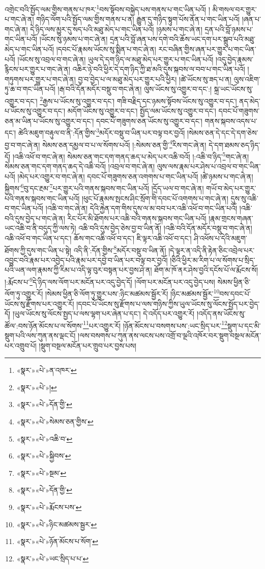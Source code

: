 འགྲེང་བའི་སྤྱོད་ལམ་གྱིས་གནས་པ་ཁར་\footnote{«སྣར་»«པེ་»ན་འཁར་}བས་སྟོབས་བསྐྱེད་པས་གནས་པ་གང་ཡིན་པའོ། །
མི་གསལ་བར་གྱུར་པ་གང་ཞེ་ན། གཉིད་ལོག་པའི་སྤྱོད་ལམ་གྱིས་གནས་པ་ན། རྒྱུན་དུ་གཉིད་སྟུག་པོས་ནོན་པ་གང་ཡིན་པའོ། །ཞན་པ་གང་ཞེ་ན། དེ་ཉིད་ལས་མྱུར་དུ་སད་པའི་མཐུ་མེད་པ་གང་ཡིན་པའོ། །ཉམས་པ་གང་ཞེ་ན། དྲན་པའི་བློ་ཉམས་པ་གང་ཡིན་པའོ། །ཡོངས་སུ་ཉམས་པ་གང་ཞེ་ན། དྲན་པའི་བློ་ཞན་པས་དགེ་བའི་ཆོས་ཡང་དག་པར་སྒྲུབ་པའི་མཐུ་མེད་པ་གང་ཡིན་པའོ། །དབང་པོ་རྣམས་ཡོངས་སུ་སྨིན་པ་གང་ཞེ་ན། རང་བཞིན་གྱིས་ཞན་པར་གྱུར་པ་གང་ཡིན་པའོ། །ཡོངས་སུ་འབྲལ་བ་གང་ཞེ་ན། ཡུལ་དེ་དག་ཉིད་ལ་མཐུ་མེད་པར་གྱུར་པ་གང་ཡིན་པའོ། །འདུ་བྱེད་རྣམས་རྙིངས་པར་གྱུར་པ་གང་ཞེ་ན། འཆིར་ཉེ་བའི་ཕྱིར་དེ་དག་ཉིད་ཀྱི་ཐ་མའི་དུས་སྐབས་ལ་བབ་པ་གང་ཡིན་པའོ། །གཏུགས་པར་གྱུར་པ་གང་ཞེ་ན། བྱ་བ་བྱེད་པ་ལ་མཐུ་མེད་པར་གྱུར་པའི་ཕྱིར། །ཚེ་ཡོངས་སུ་ཟད་པ་ན། ལུས་འཇིག་ཏུ་ཆ་བ་གང་ཡིན་པའོ། །རྒ་བའི་དོན་མདོར་བསྡུ་བ་གང་ཞེ་ན། ལུས་ཡོངས་སུ་འགྱུར་བ་དང་:། སྐྲ་ཡང་ཡོངས་སུ་འགྱུར་བ་དང་། \footnote{«སྣར་»«པེ་»།  }རྒྱས་པ་ཡོངས་སུ་འགྱུར་བ་དང་། གཟི་བརྗིད་དང་ཉམས་སྟོབས་ཡོངས་སུ་འགྱུར་བ་དང་། ནད་མེད་པ་ཡོངས་སུ་འགྱུར་བ་དང་། མདོག་ཡོངས་སུ་འགྱུར་བ་དང་། སྤྱོད་ལམ་ཡོངས་སུ་འགྱུར་བ་དང་། དབང་པོ་གཟུགས་ཅན་མ་ཡིན་པ་ཡོངས་སུ་འགྱུར་བ་དང་། དབང་པོ་གཟུགས་ཅན་ཡོངས་སུ་འགྱུར་བ་དང་། གནས་སྐབས་འདས་པ་དང་། ཚེའི་མཇུག་བརྟུལ་བ་ནི་:དོན་གྱིས་\footnote{«སྣར་»«པེ་»དོན་གྱི་}མདོར་བསྡུ་བ་ཡིན་པར་བལྟ་བར་བྱའོ། །སེམས་ཅན་དེ་དང་དེ་དག་ཅེས་བྱ་བ་གང་ཞེ་ན། སེམས་ཅན་དམྱལ་བ་པ་ལ་སོགས་པའོ། །:སེམས་ཅན་གྱི་\footnote{«སྣར་»«པེ་»སེམས་ཅན་གྱིས་}རིས་གང་ཞེ་ན། དེ་དག་ཐམས་ཅད་ཉིད་དོ། །འཆི་འཕོ་བ་གང་ཞེ་ན། སེམས་ཅན་གང་དག་གནད་ཆད་པ་མེད་པར་འཆི་བའོ། །:འཆི་བ་ཉིད་\footnote{«སྣར་»«པེ་»འཆི་བ་}གང་ཞེ་ན། སེམས་ཅན་གང་དག་གནད་ཆད་དེ་འཆི་བའོ། །འབྲལ་བ་གང་ཞེ་ན། ལུས་ལས་རྣམ་པར་ཤེས་པ་འབྲལ་བ་གང་ཡིན་པའོ། །མེད་པར་འགྱུར་བ་གང་ཞེ་ན། དབང་པོ་གཟུགས་ཅན་འགགས་པ་གང་ཡིན་པའོ། །ཚེ་ཉམས་པ་གང་ཞེ་ན། སྐྱིགས་\footnote{«སྣར་»«པེ་»སྐྱིབས་}བུ་དང་རྔམ་\footnote{«སྣར་»«པེ་»སྔམ་}པར་གྱུར་པའི་གནས་སྐབས་གང་ཡིན་པའོ། །དྲོད་ཡལ་བ་གང་ཞེ་ན། གཡོ་བ་མེད་པར་གྱུར་པའི་གནས་སྐབས་གང་ཡིན་པའོ། །ཕུང་པོ་རྣམས་སྤངས་ཤིང་སྲོག་གི་དབང་པོ་འགགས་པ་གང་ཞེ་ན། དུས་སུ་འཆི་བ་གང་ཡིན་པའོ། །འཆི་བ་གང་ཞེ་ན། དེའི་རྐྱེན་དག་གིས་དུས་ལ་མ་བབ་པར་འཆི་འཕོ་བ་གང་ཡིན་པའོ། །འཆི་བའི་དུས་བྱེད་པ་གང་ཞེ་ན། རིང་པོར་མི་ཐོགས་པར་འཆི་བའི་གནས་སྐབས་གང་ཡིན་པའོ། །རྣམ་གྲངས་གཞན་ཡང་འཆི་བ་ནི་བདུད་ཀྱི་ལས་ཏེ། འཆི་བའི་དུས་བྱེད་ཅེས་བྱ་བ་ཡིན་ནོ། །འཆི་བའི་དོན་མདོར་བསྡུ་བ་གང་ཞེ་ན། འཆི་འཕོ་བ་གང་ཡིན་པ་དང་། ཆོས་གང་འཆི་འཕོ་བ་དང་། ཇི་ལྟར་འཆི་འཕོ་བ་དང་། ཤི་འཕོས་པ་དེའི་མཇུག་ཐོགས་ཀྱི་དུས་གང་ཡིན་པ་སྟེ། འདི་ནི་:དོན་གྱིས་\footnote{«སྣར་»«པེ་»དོན་གྱི་}མདོར་བསྡུ་བ་ཡིན་ནོ། །དེ་ལྟར་ན་འདི་ནི་རྟེན་ཅིང་འབྲེལ་པར་འབྱུང་བའི་རྣམ་པར་འབྱེད་པའི་རྣམ་པར་དབྱེ་བ་ཡིན་པར་བལྟ་བར་བྱའོ། །ཅིའི་ཕྱིར་མ་རིག་པ་ལ་སོགས་པ་སྲིད་པའི་ཡན་ལག་རྣམས་ཀྱི་རིམ་པ་འདི་ལྟ་བུར་བསྟན་པར་བྱས་ཤེ་ན། ཐོག་མ་ཁོ་ནར་ཤེས་བྱའི་དངོས་པོ་ལ་རྨོངས་སོ། །:རྨོངས་པ་\footnote{«སྣར་»«པེ་»རྨོངས་པས་}དེ་ཉིད་ལས་ལོག་པར་མངོན་པར་འདུ་བྱེད་དོ། །ལོག་པར་མངོན་པར་འདུ་བྱེད་པས། སེམས་ཕྱིན་ཅི་ལོག་ཏུ་འགྱུར་རོ། །སེམས་ཕྱིན་ཅི་ལོག་ཏུ་གྱུར་པས་:ཉིང་མཚམས་སྦྱོར་རོ། །ཉིང་མཚམས་སྦྱོར་\footnote{«སྣར་»«པེ་»ཉིང་མཚམས་སྦྱར་}བས་དབང་པོ་ཡོངས་སུ་རྫོགས་པར་འགྱུར་རོ། །དབང་པོ་ཡོངས་སུ་རྫོགས་པ་ལས་གཉིས་ཀྱིས་ཡུལ་ཡོངས་སུ་ལོངས་སྤྱོད་པར་བྱེད་དོ། །ཡུལ་ཡོངས་སུ་ལོངས་སྤྱད་པ་ལས་ལྷག་པར་ཞེན་པ་དང་། དེ་འདོད་པར་འགྱུར་རོ། །འདོད་ནས་ཡོངས་སུ་ཚོལ་:བས་ཉོན་མོངས་པ་ལ་སོགས་\footnote{«སྣར་»«པེ་»ཉོན་མོངས་པ་སོག་}པར་འགྱུར་རོ། །ཉོན་མོངས་པ་བསགས་པས་:ཡང་སྲིད་པར་\footnote{«སྣར་»«པེ་»ཡང་སྲིད་པ་པ་}སྡུག་པ་དང་མི་སྡུག་པའི་ལས་ཀུན་ནས་ལྡང་ངོ། །ལས་བསགས་པ་ཀུན་ནས་ལངས་པས་འགྲོ་བ་ལྔའི་འཁོར་བར་སྡུག་བསྔལ་མངོན་པར་འགྲུབ་པོ། །སྡུག་བསྔལ་མངོན་པར་གྲུབ་པར་བྱས་པས། 